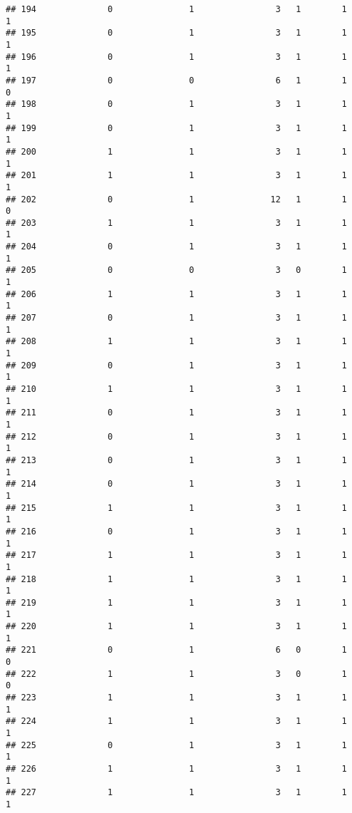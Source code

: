 \documentclass[]{article}
\begin{document}
\begin{verbatim}
## 194              0               1                3   1        1        1
## 195              0               1                3   1        1        1
## 196              0               1                3   1        1        1
## 197              0               0                6   1        1        0
## 198              0               1                3   1        1        1
## 199              0               1                3   1        1        1
## 200              1               1                3   1        1        1
## 201              1               1                3   1        1        1
## 202              0               1               12   1        1        0
## 203              1               1                3   1        1        1
## 204              0               1                3   1        1        1
## 205              0               0                3   0        1        1
## 206              1               1                3   1        1        1
## 207              0               1                3   1        1        1
## 208              1               1                3   1        1        1
## 209              0               1                3   1        1        1
## 210              1               1                3   1        1        1
## 211              0               1                3   1        1        1
## 212              0               1                3   1        1        1
## 213              0               1                3   1        1        1
## 214              0               1                3   1        1        1
## 215              1               1                3   1        1        1
## 216              0               1                3   1        1        1
## 217              1               1                3   1        1        1
## 218              1               1                3   1        1        1
## 219              1               1                3   1        1        1
## 220              1               1                3   1        1        1
## 221              0               1                6   0        1        0
## 222              1               1                3   0        1        0
## 223              1               1                3   1        1        1
## 224              1               1                3   1        1        1
## 225              0               1                3   1        1        1
## 226              1               1                3   1        1        1
## 227              1               1                3   1        1        1

\end{verbatim}
\end{document}

